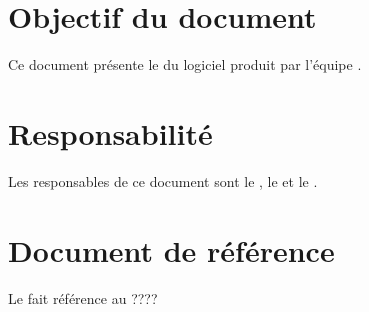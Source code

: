 \section{Objectif du document}
	Ce document présente le \PTI{} du logiciel produit par l'équipe \nomEquipe{}.
	
\section{Responsabilité}
	Les responsables de ce document sont le \CP, le \RQ{} et le \RD.
	
\section{Document de référence}
	Le \PTI{} fait référence au ????
